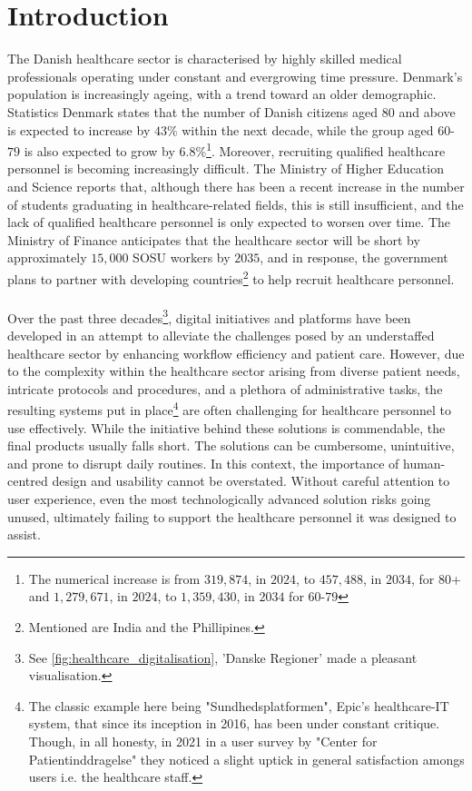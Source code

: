 \section{Introduction}
The Danish healthcare sector is characterised by highly skilled medical professionals operating under constant and evergrowing time pressure.
Denmark's population is increasingly ageing, with a trend toward an older demographic. Statistics Denmark\cite{dst-older-pop} states that the number of Danish citizens aged $80$ and above is expected to increase by $43$\% within the next decade, while the group aged $60$-$79$ is also expected to grow by $6.8$\%\footnote{The numerical increase is from $319,874$, in $2024$, to $457,488$, in $2034$, for $80$+ and $1,279,671$, in $2024$, to $1,359,430$, in $2034$ for $60$-$79$}. Moreover, recruiting qualified healthcare personnel is becoming increasingly difficult. The Ministry of Higher Education and Science\cite{MoHEaS-healthcare-rectruitment} reports that, although there has been a recent increase in the number of students graduating in healthcare-related fields, this is still insufficient, and the lack of qualified healthcare personnel is only expected to worsen over time. The Ministry of Finance\cite{MoHEaS-healthcare-rectruitment} anticipates that the healthcare sector will be short by approximately $15,000$ SOSU workers by $2035$, and in response, the government plans to partner with developing countries\footnote{Mentioned are India and the Phillipines.} to help recruit healthcare personnel.
\\
\\
Over the past three decades\footnote{See \autoref{fig:healthcare_digitalisation}, 'Danske Regioner' made a pleasant visualisation.}, digital initiatives and platforms have been developed in an attempt to alleviate the challenges posed by an understaffed healthcare sector by enhancing workflow efficiency and patient care. However, due to the complexity within the healthcare sector arising from diverse patient needs, intricate protocols and procedures, and a plethora of administrative tasks, the resulting systems put in place\footnote{The classic example here being "Sundhedsplatformen", Epic's healthcare-IT system, that since its inception in 2016, has been under constant critique\cite{DR-healthcare-platform, Altinget-healthcare-platform, TV2-healthcare-platform}. Though, in all honesty, in 2021 in a user survey by "Center for Patientinddragelse"\cite{SP-user-survey} they noticed a slight uptick in general satisfaction amongs users i.e. the healthcare staff.} are often challenging for healthcare personnel to use effectively. While the initiative behind these solutions is commendable, the final products usually falls short. The solutions can be cumbersome, unintuitive, and prone to disrupt daily routines. In this context, the importance of human-centred design and usability cannot be overstated. Without careful attention to user experience, even the most technologically advanced solution risks going unused, ultimately failing to support the healthcare personnel it was designed to assist.
